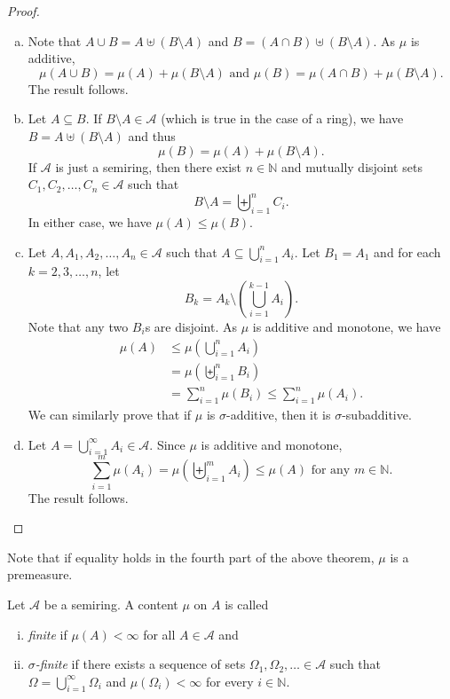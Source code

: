\begin{proof}
~
    \begin{enumerate}[(a)]
        \item Note that $A\cup B=A\uplus (B\setminus A)$ and $B=(A\cap B)\uplus (B\setminus A)$. As $\mu$ is additive,
        $$\mu(A\cup B)=\mu(A)+\mu(B\setminus A)\text{ and }\mu(B)=\mu(A\cap B)+\mu(B\setminus A).$$
        The result follows.
        
        \item Let $A\subseteq B$. If $B\setminus A\in\mathcal{A}$ (which is true in the case of a ring), we have $B=A\uplus (B\setminus A)$ and thus
        $$\mu(B)=\mu(A)+\mu(B\setminus A).$$
        If $\mathcal{A}$ is just a semiring, then there exist $n\in\mathbb{N}$ and mutually disjoint sets $C_1,C_2,\ldots,C_n\in\mathcal{A}$ such that $$B\setminus A=\biguplus_{i=1}^n C_i.$$
        In either case, we have $\mu(A)\leq \mu(B)$.
        
        \item Let $A, A_1,A_2,\ldots,A_n\in\mathcal{A}$ such that $A\subseteq\bigcup_{i=1}^n A_i$. Let $B_1=A_1$ and for each $k=2,3,\ldots,n$, let
        $$B_k = A_k\setminus\left(\bigcup_{i=1}^{k-1}A_i\right).$$
        Note that any two $B_i$s are disjoint. As $\mu$ is additive and monotone, we have
        \begin{align*}
            \mu(A) &\leq \mu\left(\bigcup_{i=1}^n A_i\right) \\
            &= \mu\left(\biguplus_{i=1}^n B_i\right) \\
            &= \sum_{i=1}^n \mu(B_i) \leq \sum_{i=1}^n \mu(A_i).
        \end{align*}
        We can similarly prove that if $\mu$ is $\sigma$-additive, then it is $\sigma$-subadditive.
        
        \item Let $A=\bigcup_{i=1}^\infty A_i\in\mathcal{A}$. Since $\mu$ is additive and monotone,
        $$\sum_{i=1}^m\mu(A_i)=\mu\left(\biguplus_{i=1}^m A_i\right)\leq \mu(A)\text{ for any $m\in\mathbb{N}$.}$$
        The result follows.
    \end{enumerate}
\end{proof}

Note that if equality holds in the fourth part of the above theorem, $\mu$ is a premeasure.

\begin{definition}
    Let $\mathcal{A}$ be a semiring. A content $\mu$ on $A$ is called
    \begin{enumerate}[(i)]
        \item \textit{finite} if $\mu(A)<\infty$ for all $A\in\mathcal{A}$ and
        \item \textit{$\sigma$-finite} if there exists a sequence of sets $\Omega_1,\Omega_2,\ldots\in\mathcal{A}$ such that $\Omega=\bigcup_{i=1}^\infty\Omega_i$ and $\mu(\Omega_i)<\infty$ for every $i\in\mathbb{N}$.
    \end{enumerate}
\end{definition}

